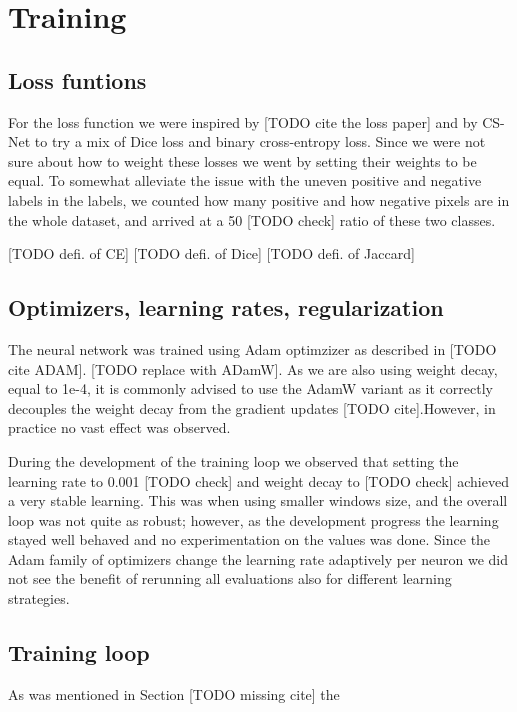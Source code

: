 \documentclass[
  digital,     %
  oneside,     %
  nosansbold,  %
  nocolorbold, %
  lof,         %
  lot,         %
]{fithesis4}
\begin{document}
\section{Training}


\subsection{Loss funtions}
For the loss function we were inspired by [TODO cite
the loss paper] and by CS-Net \parencite{Mou2021} to try a mix of Dice loss and
binary cross-entropy loss. Since we were not sure about how to weight these
losses we went by setting their weights to be equal. To somewhat alleviate the
issue with the uneven positive and negative labels in the labels, we counted how
many positive and how negative pixels are in the whole dataset, and arrived at
a 50 [TODO check] ratio of these two classes.

[TODO defi. of CE]
[TODO defi. of Dice]
[TODO defi. of Jaccard]

\subsection{Optimizers, learning rates, regularization}
The neural network was trained using Adam optimzizer as described in [TODO cite
ADAM]. [TODO replace with ADamW]. As we are also using weight decay, equal to
1e-4, it is commonly advised to use the AdamW variant as it correctly decouples
the weight decay from the gradient updates [TODO cite].However, in practice no
vast effect was observed.

During the development of the training loop we observed that setting the
learning rate to 0.001 [TODO check] and weight decay to [TODO check] achieved a
very stable learning. This was when using smaller windows size, and the overall
loop was not quite as robust; however, as the development progress the learning
stayed well behaved and no experimentation on the values was done. Since the
Adam family of optimizers change the learning rate adaptively per neuron we did
not see the benefit of rerunning all evaluations also for different learning
strategies.

\subsection{Training loop}
As was mentioned in Section [TODO missing cite] the 


\end{document}
